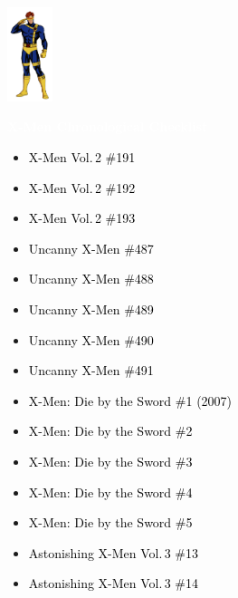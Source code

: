 \documentclass[12pt]{article}
\newcommand{\checkbox}{\raisebox{0.0ex}{\fbox{\rule{0ex}{1.5ex} \rule{1.5ex}{0ex}}}}
\begin{document}
\begin{center}
    \vspace*{2cm}
    \includegraphics[width=0.1\textwidth]{cyclops.png}
    \vspace{0.3cm}

    {\Huge \textbf{\textcolor{white}{X-Men Chronological Checklist}}}
\end{center}

\vspace{0.3cm}
\noindent
\begin{tcolorbox}[
  colback=white!95!gray,
  colframe=black,
  width=\textwidth,
  arc=4mm,
  auto outer arc,
  boxrule=0.8pt,
  left=8pt,right=8pt,top=8pt,bottom=8pt
]
\begin{itemize}[left=0pt,label={\checkbox}]
  \item \textcolor{black}{X-Men Vol.\,2 \#191}
  \item \textcolor{black}{X-Men Vol.\,2 \#192}
  \item \textcolor{black}{X-Men Vol.\,2 \#193}
  \item \textcolor{black}{Uncanny X-Men \#487}
  \item \textcolor{black}{Uncanny X-Men \#488}
  \item \textcolor{black}{Uncanny X-Men \#489}
  \item \textcolor{black}{Uncanny X-Men \#490}
  \item \textcolor{black}{Uncanny X-Men \#491}
  \item \textcolor{black}{X-Men: Die by the Sword \#1 (2007)}
  \item \textcolor{black}{X-Men: Die by the Sword \#2}
  \item \textcolor{black}{X-Men: Die by the Sword \#3}
  \item \textcolor{black}{X-Men: Die by the Sword \#4}
  \item \textcolor{black}{X-Men: Die by the Sword \#5}
  \item \textcolor{black}{Astonishing X-Men Vol.\,3 \#13}
  \item \textcolor{black}{Astonishing X-Men Vol.\,3 \#14}
\end{itemize}
\end{tcolorbox}
\end{document}
